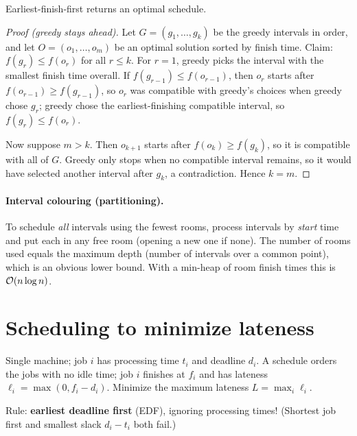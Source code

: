 \begin{theorem}
Earliest-finish-first returns an optimal schedule.
\end{theorem}
\begin{proof}[Proof (greedy stays ahead)]
Let $G=(g_1,\dots,g_k)$ be the greedy intervals in order, and let $O=(o_1,\dots,o_m)$ be an optimal solution sorted by finish time.
Claim: $f(g_r)\le f(o_r)$ for all $r\le k$. For $r=1$, greedy picks the interval with the smallest finish time overall.
If $f(g_{r-1})\le f(o_{r-1})$, then $o_r$ starts after $f(o_{r-1})\ge f(g_{r-1})$, so $o_r$ was compatible with greedy's choices
when greedy chose $g_r$; greedy chose the earliest-finishing compatible interval, so $f(g_r)\le f(o_r)$.

Now suppose $m>k$. Then $o_{k+1}$ starts after $f(o_k)\ge f(g_k)$, so it is compatible with all of $G$. Greedy only stops when no
compatible interval remains, so it would have selected another interval after $g_k$, a contradiction. Hence $k=m$.
\end{proof}

\paragraph{Interval colouring (partitioning).} To schedule \emph{all} intervals using the fewest rooms, process intervals
by \emph{start} time and put each in any free room (opening a new one if none). The number of rooms used equals the
maximum depth (number of intervals over a common point), which is an obvious lower bound. With a min-heap of room
finish times this is $\mathcal{O}(n\log n)$.

\section{Scheduling to minimize lateness}
\begin{definition}
Single machine; job $i$ has processing time $t_i$ and deadline $d_i$. A schedule orders the jobs with no idle time;
job $i$ finishes at $f_i$ and has lateness $\ell_i=\max(0,f_i-d_i)$. Minimize the maximum lateness $L=\max_i\ell_i$.
\end{definition}
Rule: \textbf{earliest deadline first} (EDF), ignoring processing times! (Shortest job first and smallest slack $d_i-t_i$ both fail.)

